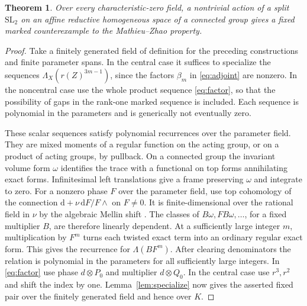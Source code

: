 \documentclass[11pt]{article}
\newtheorem{theorem}{Theorem}[section]
\newcommand{\SL}{\mathrm{SL}}
\begin{document}
\begin{theorem}\label{thm:active}
Over every characteristic-zero field, a nontrivial action of a split
\(\SL_2\) on an affine reductive homogeneous space of a connected group
gives a fixed marked counterexample to the Mathieu--Zhao property.
\end{theorem}

\begin{proof}
Take a finitely generated field of definition for the preceding
constructions and finite parameter spans. In the central case it
suffices to specialize the sequences
\(\Lambda_X(r(Z)^{3m-1})\), since the factors \(\beta_m\)
in \eqref{eq:adjoint} are nonzero. In the noncentral case use the
whole product sequence \eqref{eq:factor}, so that the possibility
of gaps in the rank-one marked sequence is included. Each sequence
is polynomial in the parameters and is generically not eventually
zero.

These scalar sequences satisfy polynomial recurrences over the
parameter field. They are mixed moments of a regular function on
the acting group, or on a product of acting groups, by pullback.
On a connected group the invariant volume form \(\omega\) identifies
the trace with a functional on top forms annihilating exact forms.
Infinitesimal left translations give a frame preserving \(\omega\)
and integrate to zero. For a nonzero phase \(F\) over the parameter
field, use top cohomology of the connection
\(\mathrm d+\nu\,\mathrm dF/F\wedge\) on \(F\ne0\).
It is finite-dimensional over the rational field in \(\nu\) by
the algebraic Mellin shift \cite[Section~1.3]{LoeserSabbah}.
The classes of \(B\omega,FB\omega,\ldots\), for a fixed multiplier \(B\),
are therefore linearly dependent. At a sufficiently large integer
\(m\), multiplication by \(F^m\) turns each twisted exact term into
an ordinary regular exact form. This gives the recurrence for
\(\Lambda(BF^m)\). After clearing denominators the relation is
polynomial in the parameters for all sufficiently large integers.
In \eqref{eq:factor} use phase \(d\otimes P_0\) and multiplier
\(d\otimes Q_0\). In the central case use \(r^3,r^2\) and shift
the index by one. Lemma~\ref{lem:specialize} now gives the asserted
fixed pair over the finitely generated field and hence over \(K\).
\end{proof}
\end{document}
